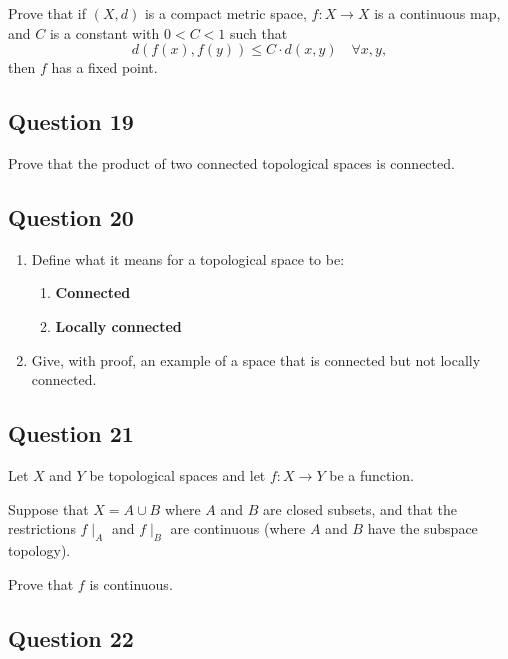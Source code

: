 \documentclass[12pt]{article}
\begin{document}
Prove that if \((X, d)\) is a compact metric space, \(f : X \to X\) is a
continuous map, and \(C\) is a constant with \(0 < C < 1\) such that \[
d(f (x), f (y)) \leq C \cdot d(x, y) \quad \forall x, y
,\] then \(f\) has a fixed point.

\hypertarget{question-19-3}{%
\subsection{Question 19}\label{question-19-3}}

Prove that the product of two connected topological spaces is connected.

\hypertarget{question-20-3}{%
\subsection{Question 20}\label{question-20-3}}

\begin{enumerate}
\def\labelenumi{\alph{enumi}.}
\item
  Define what it means for a topological space to be:

  \begin{enumerate}
  \def\labelenumii{\roman{enumii}.}
  \item
    \textbf{Connected}
  \item
    \textbf{Locally connected}
  \end{enumerate}
\item
  Give, with proof, an example of a space that is connected but not
  locally connected.
\end{enumerate}

\hypertarget{question-21-3}{%
\subsection{Question 21}\label{question-21-3}}

Let \(X\) and \(Y\) be topological spaces and let \(f : X \to Y\) be a
function.

Suppose that \(X = A \cup B\) where \(A\) and \(B\) are closed subsets,
and that the restrictions \(f \mid_A\) and \(f \mid_B\) are continuous
(where \(A\) and \(B\) have the subspace topology).

Prove that \(f\) is continuous.

\hypertarget{question-22-3}{%
\subsection{Question 22}\label{question-22-3}}
\end{document}
